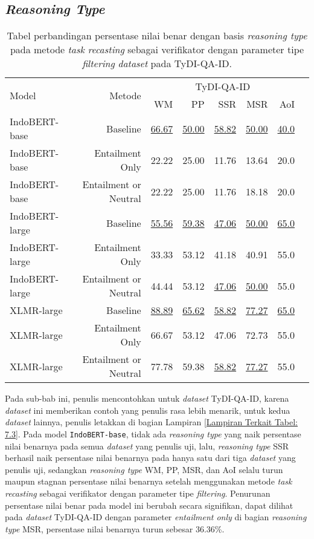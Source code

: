 \subsection{\emph{Reasoning Type}}
\begin{table}[H]\centering
\begin{tabular}{lrrrrrrr}\toprule
\multirow{2}{*}{Model} &\multirow{2}{*}{Metode} &\multicolumn{5}{c}{TyDI-QA-ID} \\\cmidrule{3-7}
& &WM &PP &SSR &MSR &AoI \\\midrule
IndoBERT-base &Baseline &\underline{66.67} &\underline{50.00} &\underline{58.82} &\underline{50.00} &\underline{40.0} \\
IndoBERT-base &Entailment Only &22.22 &25.00 &11.76 &13.64 &20.0 \\
IndoBERT-base &Entailment or Neutral &22.22 &25.00 &11.76 &18.18 &20.0 \\
\hline
IndoBERT-large &Baseline &\underline{55.56} &\underline{59.38} &\underline{47.06} &\underline{50.00} &\underline{65.0} \\
IndoBERT-large &Entailment Only &33.33 &53.12 &41.18 &40.91 &55.0 \\
IndoBERT-large &Entailment or Neutral &44.44 &53.12 &\underline{47.06} &\underline{50.00} &55.0 \\
\hline
XLMR-large &Baseline &\underline{88.89} &\underline{65.62} &\underline{58.82} &\underline{77.27} &\underline{65.0} \\
XLMR-large &Entailment Only &66.67 &53.12 &47.06 &72.73 &55.0 \\
XLMR-large &Entailment or Neutral &77.78 &59.38 &\underline{58.82} &\underline{77.27} &55.0 \\
\bottomrule
\end{tabular}
\caption{Tabel perbandingan persentase nilai benar dengan basis \emph{reasoning type} pada metode \emph{task recasting} sebagai verifikator dengan parameter tipe \emph{filtering} \emph{dataset} pada TyDI-QA-ID.}
\end{table}

Pada sub-bab ini, penulis mencontohkan untuk \emph{dataset} TyDI-QA-ID, karena \emph{dataset} ini memberikan contoh yang penulis rasa lebih menarik, untuk kedua \emph{dataset} lainnya, penulis letakkan di bagian Lampiran \ref{Lampiran Terkait Tabel: 7.3}. Pada model \texttt{IndoBERT-base}, tidak ada \emph{reasoning type} yang naik persentase nilai benarnya pada semua \emph{dataset} yang penulis uji, lalu, \emph{reasoning type} SSR berhasil naik persentase nilai benarnya pada hanya satu dari tiga \emph{dataset} yang penulis uji, sedangkan \emph{reasoning type} WM, PP, MSR, dan AoI selalu turun maupun stagnan persentase nilai benarnya setelah menggunakan metode \emph{task recasting} sebagai verifikator dengan parameter tipe \emph{filtering}. Penurunan persentase nilai benar pada model ini berubah secara signifikan, dapat dilihat pada \emph{dataset} TyDI-QA-ID  dengan parameter \emph{entailment only} di bagian \emph{reasoning type} MSR, persentase nilai benarnya turun sebesar 36.36\%.

